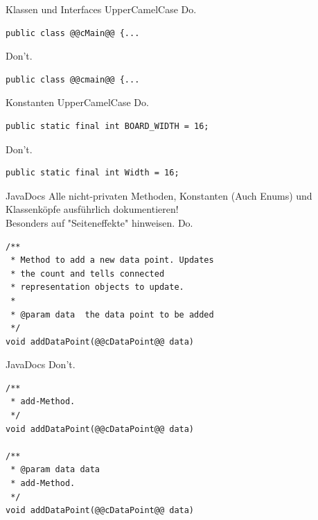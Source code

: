 \documentclass[aspectratio=169]{beamer}
\begin{document}
\begin{frame}[fragile]
  \begin{block}{Klassen und Interfaces}
    UpperCamelCase \linebreak
    \pause
    \color{nicegreen}Do.\color{FGround}
    \begin{lstlisting}[numbers=none]
public class @@cMain@@ {...
    \end{lstlisting}
    \pause
    \color{alertcolor}Don't.\color{FGround}
    \begin{lstlisting}[numbers=none]
public class @@cmain@@ {...
    \end{lstlisting}
  \end{block}

  \begin{block}{Konstanten}
    UpperCamelCase \linebreak
    \pause
    \color{nicegreen}Do.\color{FGround}
    \begin{lstlisting}[numbers=none]
public static final int BOARD_WIDTH = 16;
    \end{lstlisting}
    \pause
    \color{alertcolor}Don't.\color{FGround}
    \begin{lstlisting}[numbers=none]
public static final int Width = 16;
    \end{lstlisting}
  \end{block}
\end{frame}

\begin{frame}[fragile]
  \begin{block}{JavaDocs}
    Alle nicht-privaten Methoden, Konstanten (Auch Enums) und Klassenköpfe ausführlich dokumentieren! \\
    Besonders auf "Seiteneffekte" hinweisen. \linebreak
    \pause
    \color{nicegreen}Do.\color{FGround}
    \begin{lstlisting}[numbers=none]
/** 
 * Method to add a new data point. Updates 
 * the count and tells connected  
 * representation objects to update. 
 *
 * @param data  the data point to be added 
 */ 
void addDataPoint(@@cDataPoint@@ data) 
    \end{lstlisting}
  \end{block}
\end{frame}

\begin{frame}[fragile]
  \begin{block}{JavaDocs}
    \pause
    \color{alertcolor}Don't.\color{FGround}
    \begin{lstlisting}[numbers=none]
/** 
 * add-Method.  
 */ 
void addDataPoint(@@cDataPoint@@ data)

/** 
 * @param data data
 * add-Method.  
 */ 
void addDataPoint(@@cDataPoint@@ data)
    \end{lstlisting}
  \end{block}
\end{frame}
\end{document}
